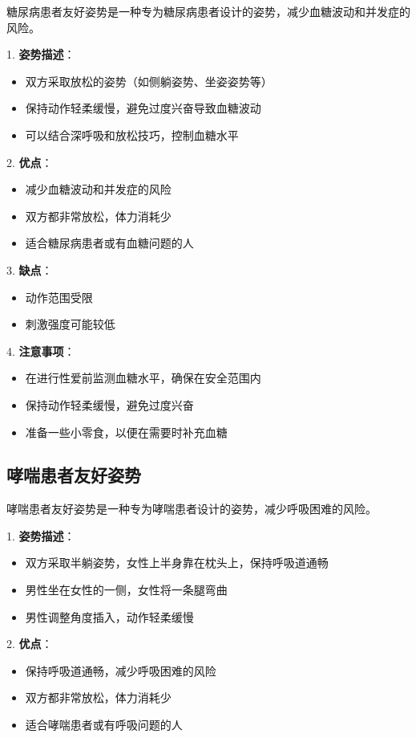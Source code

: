 \documentclass[12pt,UTF8]{ctexbook}
\begin{document}
糖尿病患者友好姿势是一种专为糖尿病患者设计的姿势，减少血糖波动和并发症的风险。

1. \textbf{姿势描述}：
  \begin{itemize}
  \item 双方采取放松的姿势（如侧躺姿势、坐姿姿势等）
  \item 保持动作轻柔缓慢，避免过度兴奋导致血糖波动
  \item 可以结合深呼吸和放松技巧，控制血糖水平
  \end{itemize}

2. \textbf{优点}：
  \begin{itemize}
  \item 减少血糖波动和并发症的风险
  \item 双方都非常放松，体力消耗少
  \item 适合糖尿病患者或有血糖问题的人
  \end{itemize}

3. \textbf{缺点}：
  \begin{itemize}
  \item 动作范围受限
  \item 刺激强度可能较低
  \end{itemize}

4. \textbf{注意事项}：
  \begin{itemize}
  \item 在进行性爱前监测血糖水平，确保在安全范围内
  \item 保持动作轻柔缓慢，避免过度兴奋
  \item 准备一些小零食，以便在需要时补充血糖
  \end{itemize}

\subsection{哮喘患者友好姿势}

哮喘患者友好姿势是一种专为哮喘患者设计的姿势，减少呼吸困难的风险。

1. \textbf{姿势描述}：
  \begin{itemize}
  \item 双方采取半躺姿势，女性上半身靠在枕头上，保持呼吸道通畅
  \item 男性坐在女性的一侧，女性将一条腿弯曲
  \item 男性调整角度插入，动作轻柔缓慢
  \end{itemize}

2. \textbf{优点}：
  \begin{itemize}
  \item 保持呼吸道通畅，减少呼吸困难的风险
  \item 双方都非常放松，体力消耗少
  \item 适合哮喘患者或有呼吸问题的人
  \end{itemize}
\end{document}
